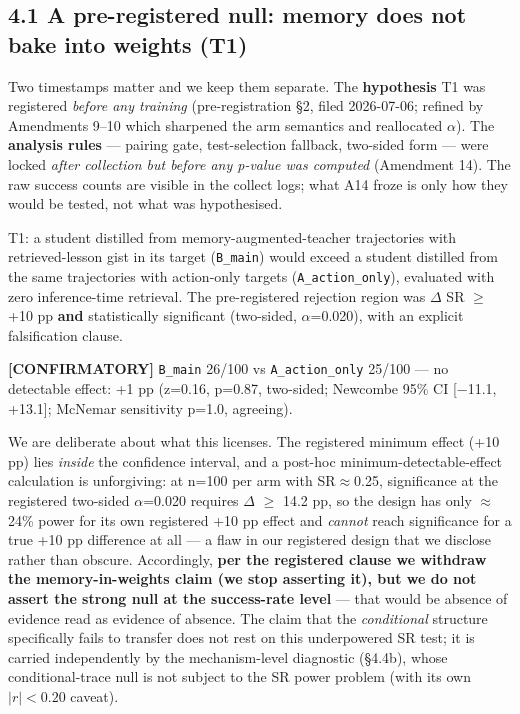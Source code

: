 

\subsection*{4.1 A pre-registered null: memory does not bake into weights (T1)}

Two timestamps matter and we keep them separate. The \textbf{hypothesis}
T1 was registered \emph{before any training} (pre-registration \S2, filed
2026-07-06; refined by Amendments 9--10 which sharpened the arm
semantics and reallocated $\alpha$). The \textbf{analysis rules} --- pairing gate,
test-selection fallback, two-sided form --- were locked \emph{after
collection but before any p-value was computed} (Amendment 14). The
raw success counts are visible in the collect logs; what A14 froze is
only how they would be tested, not what was hypothesised.

T1: a student distilled from memory-augmented-teacher trajectories
with retrieved-lesson gist in its target (\texttt{B\_main}) would exceed a
student distilled from the same trajectories with action-only targets
(\texttt{A\_action\_only}), evaluated with zero inference-time retrieval. The
pre-registered rejection region was $\Delta$ SR $\ge$ +10 pp \textbf{and} statistically
significant (two-sided, $\alpha$=0.020), with an explicit falsification clause.

\textbf{[CONFIRMATORY]} \texttt{B\_main} 26/100 vs \texttt{A\_action\_only} 25/100 --- no
detectable effect: +1 pp (z=0.16, p=0.87, two-sided; Newcombe 95\% CI
[$-$11.1, +13.1]; McNemar sensitivity p=1.0, agreeing).

We are deliberate about what this licenses. The registered minimum
effect (+10 pp) lies \emph{inside} the confidence interval, and a post-hoc
minimum-detectable-effect calculation is unforgiving: at n=100 per arm
with SR$\approx$0.25, significance at the registered two-sided $\alpha$=0.020 requires
$\Delta$ $\ge$ 14.2 pp, so the design has only $\approx$24\% power for its own registered
+10 pp effect and \emph{cannot} reach significance for a true +10 pp
difference at all --- a flaw in our registered design that we disclose
rather than obscure. Accordingly, \textbf{per the registered clause we
withdraw the memory-in-weights claim (we stop asserting it), but we do
not assert the strong null at the success-rate level} --- that would be
absence of evidence read as evidence of absence. The claim that the
\emph{conditional} structure specifically fails to transfer does not rest on
this underpowered SR test; it is carried independently by the
mechanism-level diagnostic (\S4.4b), whose conditional-trace null is not
subject to the SR power problem (with its own $|r|<0.20$ caveat).

